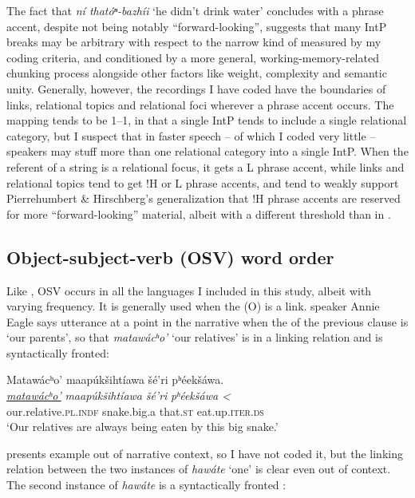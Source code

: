 \documentclass[output=paper]{LSP/langsci}
\begin{document}
The fact that \emph{ní thatóⁿ-bazhíi} `he didn’t drink water' concludes with a phrase accent, despite not being notably “forward-looking”, suggests that many IntP breaks may be arbitrary with respect to the narrow kind of  measured by my coding criteria, and conditioned by a more general, working-memory-related chunking process alongside other factors like weight, complexity and semantic unity. Generally, however, the recordings I have coded have the boundaries of links, relational topics and relational foci wherever a phrase accent occurs. The mapping tends to be 1--1, in that a single IntP tends to include a single relational category, but I suspect that in faster speech -- of which I coded very little -- speakers may stuff more than one relational category into a single IntP. When the referent of a string is a relational focus, it gets a L phrase accent, while links and relational topics tend to get !H or L phrase accents, and tend to weakly support Pierrehumbert \& Hirschberg’s \citeyearpar{PierrehumbertHirschberg1990} generalization that !H phrase accents are reserved for more “forward-looking” material, albeit with a different threshold than in .

\subsection{Object-subject-verb (OSV) word order}\label{osv}

Like , OSV  occurs in all the languages I included in this study, albeit with varying frequency. It is generally used when the  (O) is a link.  speaker Annie Eagle says utterance  at a point in the narrative when the  of the previous clause is `our parents', so that \emph{matawácʰo’} `our relatives' is in a linking relation and is syntactically fronted:

\ea\label{eagleosv}
Matawácʰo’ maapúkšihtíawa šé’ri pʰéekšáwa.\footnotemark\\
\gll	\emph{\underline{matawácʰo’}}		\emph{maapúkšihtíawa} 	\emph{šé’ri} 	\emph{pʰéekšáwa <}\\
	our.relative.\textsc{pl.indf} 		snake.big.a 			that.\textsc{st} 	eat.up.\textsc{iter.ds}\\
\glt	`Our relatives are always being eaten by this big snake.'
\z

\citet[102]{Graczyk1991a} presents  example  out of narrative context, so I have not coded it, but the linking relation between the two instances of \emph{hawáte} `one' is clear even out of context. The second instance of \emph{hawáte} is a syntactically fronted :
\end{document}

